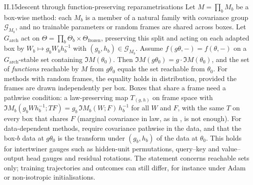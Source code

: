 \begin{observation}{II.15}{descent through function-preserving reparametrisations}
Let $M=\prod_bM_b$ be a box-wise method: each $M_b$ is a member of a natural family with covariance group
$\mathcal G_{M_b}$, and no trainable parameters or random frames are shared across boxes. Let $G_{\mathrm{arch}}$ act on
$\Theta=\prod_b\Theta_b\times\Theta_{\mathrm{frozen}}$, preserving this split and acting on each adapted box by
$W_b\mapsto g_bW_bh_b^{-1}$ with $(g_b,h_b)\in\mathcal G_{M_b}$. Assume $f(g\theta,-)=f(\theta,-)$ on a
$G_{\mathrm{arch}}$-stable set containing $\Im M(\theta_0)$. Then $\Im M(g\theta_0)=g\cdot\Im M(\theta_0)$, and the set
of \emph{functions} reachable by $M$ from $g\theta_0$ equals the set reachable from $\theta_0$. For methods with random
frames, the equality holds in distribution, provided the frames are drawn independently per box. Boxes that share a
frame need a pathwise condition: a law-preserving map $T_{(g,h)}$ on frame space with
$\Im M_b(g_bWh_b^{-1};TF)=g_b\,\Im M_b(W;F)\,h_b^{-1}$ for all $W$ and $F$, with the same $T$ on every box that shares
$F$ (marginal covariance in law, as in , is not enough). For data-dependent methods, require
covariance pathwise in the data, and that the box-$b$ data at $g\theta_0$ is the  transform
under $(g_b,h_b)$ of the data at $\theta_0$. This holds for intertwiner gauges such as hidden-unit permutations,
query--key and value--output head gauges and residual rotations. The statement concerns reachable sets only; training
trajectories and outcomes can still differ, for instance under Adam or non-isotropic initialisations.


\end{observation}
